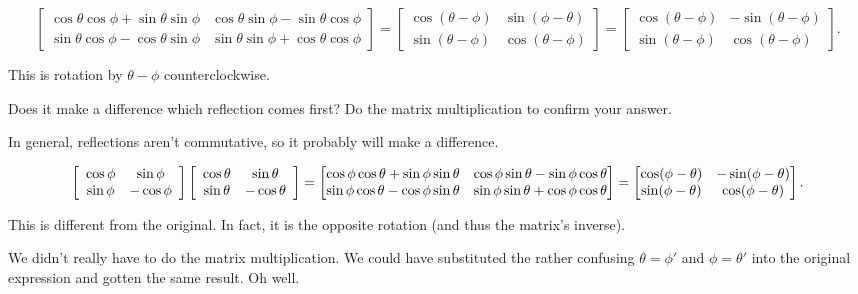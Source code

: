 \documentclass[../key.tex]{subfiles}
\begin{document}
$$\begin{bmatrix}
\cos\theta\cos\phi + \sin\theta\sin\phi & \cos\theta\sin\phi-\sin\theta\cos\phi \\ \sin\theta\cos\phi-\cos\theta\sin\phi & \sin\theta\sin\phi + \cos\theta\cos\phi
\end{bmatrix}=\begin{bmatrix}\cos(\theta-\phi) & \sin(\phi-\theta) \\ \sin(\theta-\phi) & \cos(\theta-\phi)\end{bmatrix}=\begin{bmatrix}\cos(\theta-\phi) & -\sin(\theta-\phi) \\ \sin(\theta-\phi) & \cos(\theta-\phi)\end{bmatrix}.
$$

This is rotation by $\theta-\phi$ counterclockwise.

\begin{inner_problem}
\item Does it make a difference which reflection comes first? Do the matrix multiplication to confirm your answer.
\end{inner_problem}

In general, reflections aren't commutative, so it probably will make a difference.

$$\left[\begin{array}{cc} \cos\phi & \sin\phi \\ \sin\phi & -\cos\phi \end{array}\right]\left[\begin{array}{cc} \cos\theta & \sin\theta \\ \sin\theta & -\cos\theta \end{array}\right]=\begin{bmatrix} \cos\phi\cos\theta + \sin\phi\sin\theta & \cos\phi\sin\theta - \sin\phi\cos\theta \\ \sin\phi\cos\theta - \cos\phi\sin\theta & \sin\phi\sin\theta + \cos\phi\cos\theta \\ \end{bmatrix} = \begin{bmatrix}\cos(\phi-\theta) & -\sin(\phi-\theta) \\ \sin(\phi-\theta) & \cos(\phi-\theta)\end{bmatrix}.$$

This is different from the original. In fact, it is the opposite rotation (and thus the matrix's inverse).

We didn't really have to do the matrix multiplication. We could have substituted the rather confusing $\theta = \phi'$ and $\phi = \theta'$ into the original expression and gotten the same result. Oh well.
\end{document}
